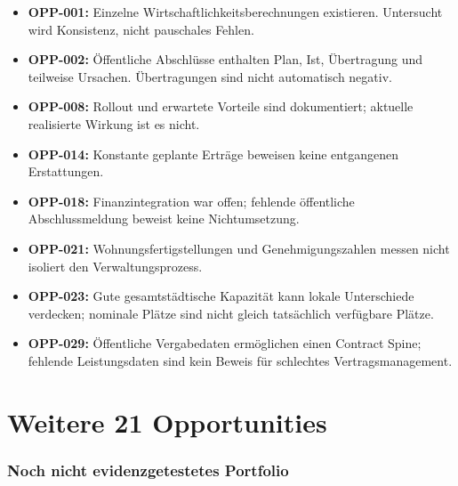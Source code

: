 \documentclass[11pt,a4paper]{article}
\begin{document}
\begin{itemize}
  \item \textbf{OPP-001:} Einzelne Wirtschaftlichkeitsberechnungen existieren. Untersucht wird Konsistenz, nicht pauschales Fehlen.
  \item \textbf{OPP-002:} Öffentliche Abschlüsse enthalten Plan, Ist, Übertragung und teilweise Ursachen. Übertragungen sind nicht automatisch negativ.
  \item \textbf{OPP-008:} Rollout und erwartete Vorteile sind dokumentiert; aktuelle realisierte Wirkung ist es nicht.
  \item \textbf{OPP-014:} Konstante geplante Erträge beweisen keine entgangenen Erstattungen.
  \item \textbf{OPP-018:} Finanzintegration war offen; fehlende öffentliche Abschlussmeldung beweist keine Nichtumsetzung.
  \item \textbf{OPP-021:} Wohnungsfertigstellungen und Genehmigungszahlen messen nicht isoliert den Verwaltungsprozess.
  \item \textbf{OPP-023:} Gute gesamtstädtische Kapazität kann lokale Unterschiede verdecken; nominale Plätze sind nicht gleich tatsächlich verfügbare Plätze.
  \item \textbf{OPP-029:} Öffentliche Vergabedaten ermöglichen einen Contract Spine; fehlende Leistungsdaten sind kein Beweis für schlechtes Vertragsmanagement.
\end{itemize}

\part{Weitere 21 Opportunities}

\section{Noch nicht evidenzgetestetes Portfolio}
\end{document}
